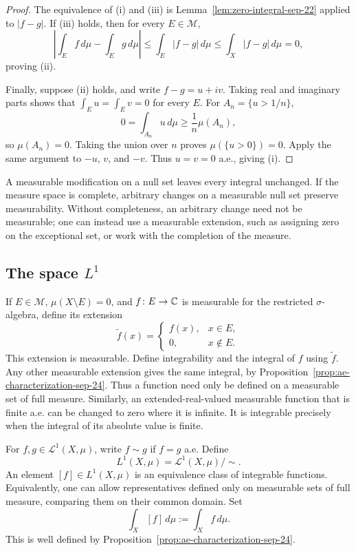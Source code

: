 \begin{proof}
  The equivalence of (i) and (iii) is
  Lemma~\ref{lem:zero-integral-sep-22} applied to $|f-g|$. If (iii)
  holds, then for every $E\in\mathcal M$,
  \[
    \left|\int_E f\,d\mu-\int_E g\,d\mu\right|
      \leq\int_E|f-g|\,d\mu
      \leq\int_X|f-g|\,d\mu=0,
  \]
  proving (ii).

  Finally, suppose (ii) holds, and write $f-g=u+iv$. Taking real and
  imaginary parts shows that $\int_E u=\int_E v=0$ for every $E$.
  For $A_n=\{u>1/n\}$,
  \[
    0=\int_{A_n}u\,d\mu\geq\frac1n\mu(A_n),
  \]
  so $\mu(A_n)=0$. Taking the union over $n$ proves
  $\mu(\{u>0\})=0$. Apply the same argument to $-u$, $v$, and $-v$.
  Thus $u=v=0$ a.e., giving (i).
\end{proof}

\begin{remark}
  A measurable modification on a null set leaves every integral
  unchanged. If the measure space is complete, arbitrary changes on
  a measurable null set preserve measurability. Without completeness,
  an arbitrary change need not be measurable; one can instead use a
  measurable extension, such as assigning zero on the exceptional
  set, or work with the completion of the measure.
\end{remark}

\subsection{The space \texorpdfstring{$L^1$}{L1}}

If $E\in\mathcal M$, $\mu(X\setminus E)=0$, and $f\colon E\to\mathbb{C}$
is measurable for the restricted $\sigma$-algebra, define its extension
\[
  \widetilde f(x)=
  \begin{cases}
    f(x),&x\in E,\\
    0,&x\notin E.
  \end{cases}
\]
This extension is measurable. Define integrability and the integral of
$f$ using $\widetilde f$. Any other measurable extension gives the
same integral, by Proposition~\ref{prop:ae-characterization-sep-24}.
Thus a function need only be defined on a measurable set of full
measure. Similarly, an extended-real-valued measurable function that
is finite a.e. can be changed to zero where it is infinite. It is
integrable precisely when the integral of its absolute value is finite.

\begin{definition}
  For $f,g\in\mathcal L^1(X,\mu)$, write $f\sim g$ if $f=g$ a.e.
  Define
  \[
    L^1(X,\mu)=\mathcal L^1(X,\mu)/{\sim}.
  \]
  An element $[f]\in L^1(X,\mu)$ is an equivalence class of integrable
  functions. Equivalently, one can allow representatives defined only
  on measurable sets of full measure, comparing them on their common
  domain. Set
  \[
    \int_X[f]\,d\mu:=\int_X f\,d\mu.
  \]
  This is well defined by Proposition~\ref{prop:ae-characterization-sep-24}.
\end{definition}


